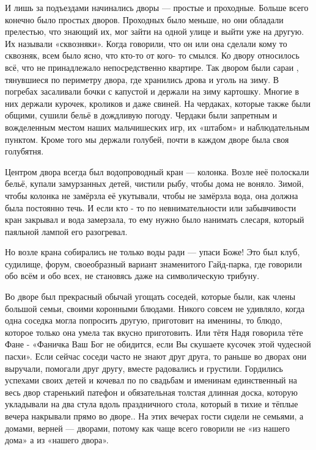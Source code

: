 И лишь за подъездами начинались дворы — простые и проходные. Больше всего
конечно было простых дворов. Проходных было меньше, но они обладали прелестью,
что знающий их, мог  зайти на одной улице и выйти уже на другую. Их называли
«сквозняки». Когда говорили, что он или она сделали  кому то  сквозняк, всем
было ясно, что кто-то от кого- то смылся. Ко двору относилось всё, что не
принадлежало  непосредственно квартире. Так двором  были сараи , тянувшиеся по
периметру двора, где хранились дрова и уголь на зиму.  В погребах засаливали
бочки с капустой и держали  на зиму картошку.  Многие в них держали курочек,
кроликов и даже свиней. На чердаках, которые также были общими, сушили бельё в
дождливую погоду. Чердаки были запретным и вожделенным местом наших
мальчишеских игр, их «штабом» и наблюдательным пунктом. Кроме того мы держали
голубей,  почти в каждом дворе была своя голубятня. 

Центром двора  всегда был водопроводный кран — колонка. Возле неё полоскали
бельё, купали замурзанных детей, чистили рыбу,  чтобы дома не воняло. Зимой,
чтобы колонка не замёрзла её укутывали, чтобы не замёрзла вода, она должна была
постоянно течь. И если кто - то по невнимательности или забывчивости кран
закрывал и вода замерзала, то ему нужно было нанимать слесаря, который паяльной
лампой его разогревал.

Но возле крана собирались не только  воды ради — упаси Боже! Это был клуб,
судилище, форум, своеобразный вариант знаменитого Гайд-парка, где говорили обо
всём и обо всех, не становясь даже на символическую трибуну.

Во дворе был прекрасный обычай угощать соседей, которые были, как члены
большой семьи, своими коронными блюдами. Никого совсем не удивляло, когда одна
соседка могла попросить другую, приготовит на именины, то блюдо, которое
только она умела так вкусно приготовить. Или тётя Надя говорила тёте Фане
-  «Фаничка Ваш Бог не обидится, если Вы скушаете кусочек этой чудесной пасхи».
Если сейчас соседи часто не знают друг друга, то раньше во дворах они выручали,
помогали друг другу, вместе радовались и грустили.  Гордились успехами  своих
детей и кочевал по по свадьбам и именинам единственный на весь двор старенький
патефон и обязательная толстая длинная доска, которую укладывали на два стула
вдоль праздничного стола, который в тихие и тёплые вечера накрывали прямо во
дворе.. На этих вечерах гости сидели не семьями, а домами, верней — дворами,
потому как чаще всего говорили не «из нашего дома» а из «нашего двора». 

